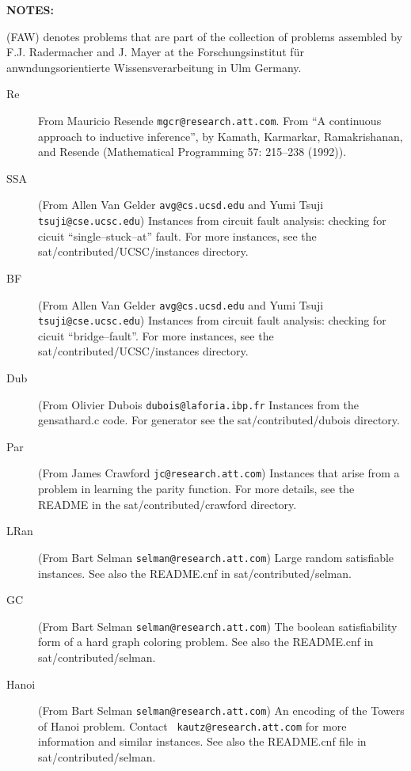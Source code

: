 \bigskip
{\bf NOTES:}

(FAW) denotes problems that are part of the collection of problems
assembled by F.J. Radermacher and J. Mayer at the Forschungsinstitut
f\"ur anwndungsorientierte Wissensverarbeitung in Ulm Germany.
\begin{description}

\item[Re] From Mauricio Resende {\tt mgcr@research.att.com}. From ``A
continuous approach to inductive inference'', by Kamath, Karmarkar,
Ramakrishanan, and Resende (Mathematical Programming 57: 215--238
(1992)).

\item[SSA] (From Allen Van Gelder {\tt avg@cs.ucsd.edu} and Yumi Tsuji
  {\tt tsuji@cse.ucsc.edu}) Instances from circuit fault analysis:
checking for cicuit ``single--stuck--at'' fault.  For more instances,
see the sat/contributed/UCSC/instances directory.

\item[BF] (From Allen Van Gelder {\tt avg@cs.ucsd.edu} and Yumi Tsuji
  {\tt tsuji@cse.ucsc.edu}) Instances from circuit fault analysis:
  checking for cicuit ``bridge--fault''. For more
instances, see the sat/contributed/UCSC/instances directory.

\item[Dub] (From Olivier Dubois {\tt dubois@laforia.ibp.fr}  Instances
from the gensathard.c code.  For generator see the
sat/contributed/dubois directory.

\item[Par] (From James Crawford {\tt jc@research.att.com}) Instances
that arise from a problem in learning the parity function.  For more
details, see the README in the sat/contributed/crawford directory.

\item[LRan] (From Bart Selman {\tt selman@research.att.com}) Large
random satisfiable instances. See also the README.cnf in
sat/contributed/selman. 

\item[GC] (From Bart Selman {\tt selman@research.att.com}) The boolean
satisfiability form of a hard graph coloring problem.  See also the
README.cnf in sat/contributed/selman.

\item[Hanoi] (From Bart Selman {\tt selman@research.att.com}) An
encoding of the Towers of Hanoi problem.  Contact {\tt
kautz@research.att.com} for more information and similar instances.
See also the README.cnf file in sat/contributed/selman.


\end{description}
